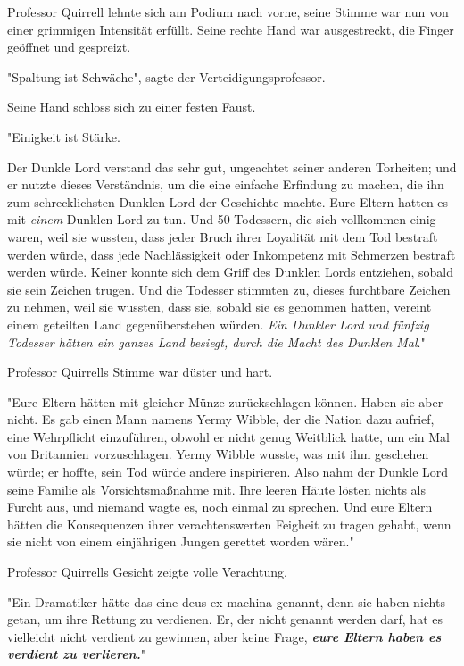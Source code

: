 {Professor Quirrell lehnte sich am Podium nach vorne, seine Stimme war nun von einer grimmigen Intensität erfüllt. Seine rechte Hand war ausgestreckt, die Finger geöffnet und gespreizt.

"Spaltung ist Schwäche", sagte der Verteidigungsprofessor.

Seine Hand schloss sich zu einer festen Faust.

"Einigkeit ist Stärke.

Der Dunkle Lord verstand das sehr gut, ungeachtet seiner anderen Torheiten; und er nutzte dieses Verständnis, um die eine einfache Erfindung zu machen, die ihn zum schrecklichsten Dunklen Lord der Geschichte machte. Eure Eltern hatten es mit \emph{einem} Dunklen Lord zu tun. Und 50 Todessern, die sich vollkommen einig waren, weil sie wussten, dass jeder Bruch ihrer Loyalität mit dem Tod bestraft werden würde, dass jede Nachlässigkeit oder Inkompetenz mit Schmerzen bestraft werden würde. Keiner konnte sich dem Griff des Dunklen Lords entziehen, sobald sie sein Zeichen trugen. Und die Todesser stimmten zu, dieses furchtbare Zeichen zu nehmen, weil sie wussten, dass sie, sobald sie es genommen hatten, vereint einem geteilten Land gegenüberstehen würden. \emph{Ein Dunkler Lord und fünfzig Todesser hätten ein ganzes Land besiegt, durch die Macht des Dunklen Mal}."

Professor Quirrells Stimme war düster und hart.

"Eure Eltern hätten mit gleicher Münze zurückschlagen können. Haben sie aber nicht. Es gab einen Mann namens Yermy Wibble, der die Nation dazu aufrief, eine Wehrpflicht einzuführen, obwohl er nicht genug Weitblick hatte, um ein Mal von Britannien vorzuschlagen. Yermy Wibble wusste, was mit ihm geschehen würde; er hoffte, sein Tod würde andere inspirieren. Also nahm der Dunkle Lord seine Familie als Vorsichtsmaßnahme mit. Ihre leeren Häute lösten nichts als Furcht aus, und niemand wagte es, noch einmal zu sprechen. Und eure Eltern hätten die Konsequenzen ihrer verachtenswerten Feigheit zu tragen gehabt, wenn sie nicht von einem einjährigen Jungen gerettet worden wären."

Professor Quirrells Gesicht zeigte volle Verachtung.

"Ein Dramatiker hätte das eine deus ex machina genannt, denn sie haben nichts getan, um ihre Rettung zu verdienen. Er, der nicht genannt werden darf, hat es vielleicht nicht verdient zu gewinnen, aber keine Frage, \textbf{\emph{eure Eltern haben es verdient zu verlieren.}}"

}
